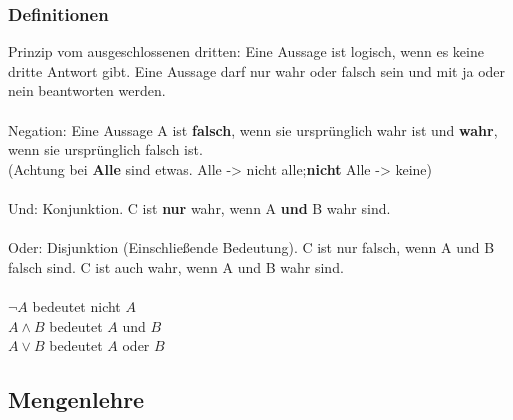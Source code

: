 \documentclass[11pt, a4paper]{article}
\begin{document}
\subsubsection{Definitionen}
Prinzip vom ausgeschlossenen dritten: Eine Aussage ist logisch, wenn es keine dritte Antwort gibt. Eine Aussage darf nur wahr oder falsch sein und mit ja oder nein beantworten werden.\\\\
Negation: Eine Aussage A ist \textbf{falsch}, wenn sie ursprünglich wahr ist und \textbf{wahr}, wenn sie ursprünglich falsch ist.\\(Achtung bei \textbf{Alle} sind etwas. Alle -> nicht alle;\textbf{nicht} Alle -> keine)\\\\
Und: Konjunktion. C ist \textbf{nur} wahr, wenn A \textbf{und} B wahr sind.\\\\
Oder: Disjunktion (Einschließende Bedeutung). C ist nur falsch, wenn A und B falsch sind. C ist auch wahr, wenn A und B wahr sind.\\\\
$\lnot A$ bedeutet nicht $A$\\
$A \land B$ bedeutet $A$ und $B$\\
$A \lor B$ bedeutet $A$ oder $B$


\subsection{Mengenlehre}
\end{document}
